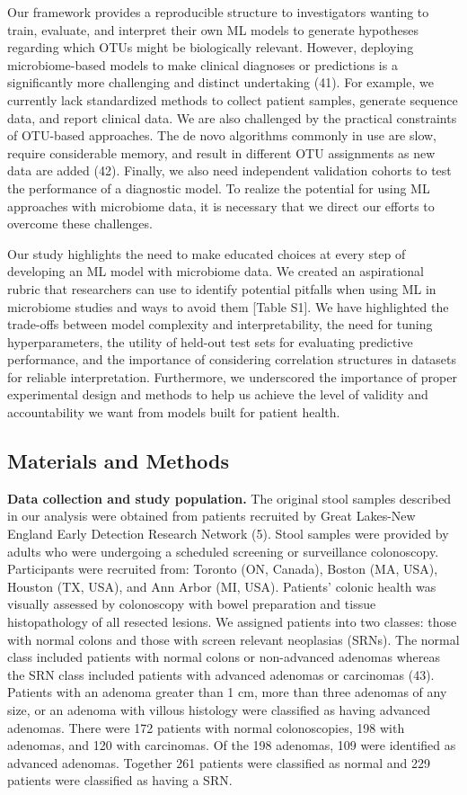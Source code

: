 \documentclass[11pt,]{article}
\begin{document}
Our framework provides a reproducible structure to investigators wanting
to train, evaluate, and interpret their own ML models to generate
hypotheses regarding which OTUs might be biologically relevant. However,
deploying microbiome-based models to make clinical diagnoses or
predictions is a significantly more challenging and distinct undertaking
(41). For example, we currently lack standardized methods to collect
patient samples, generate sequence data, and report clinical data. We
are also challenged by the practical constraints of OTU-based
approaches. The de novo algorithms commonly in use are slow, require
considerable memory, and result in different OTU assignments as new data
are added (42). Finally, we also need independent validation cohorts to
test the performance of a diagnostic model. To realize the potential for
using ML approaches with microbiome data, it is necessary that we direct
our efforts to overcome these challenges.

Our study highlights the need to make educated choices at every step of
developing an ML model with microbiome data. We created an aspirational
rubric that researchers can use to identify potential pitfalls when
using ML in microbiome studies and ways to avoid them {[}Table S1{]}. We
have highlighted the trade-offs between model complexity and
interpretability, the need for tuning hyperparameters, the utility of
held-out test sets for evaluating predictive performance, and the
importance of considering correlation structures in datasets for
reliable interpretation. Furthermore, we underscored the importance of
proper experimental design and methods to help us achieve the level of
validity and accountability we want from models built for patient
health.

\subsection{Materials and Methods}\label{materials-and-methods}

\textbf{Data collection and study population.} The original stool
samples described in our analysis were obtained from patients recruited
by Great Lakes-New England Early Detection Research Network (5). Stool
samples were provided by adults who were undergoing a scheduled
screening or surveillance colonoscopy. Participants were recruited from:
Toronto (ON, Canada), Boston (MA, USA), Houston (TX, USA), and Ann Arbor
(MI, USA). Patients' colonic health was visually assessed by colonoscopy
with bowel preparation and tissue histopathology of all resected
lesions. We assigned patients into two classes: those with normal colons
and those with screen relevant neoplasias (SRNs). The normal class
included patients with normal colons or non-advanced adenomas whereas
the SRN class included patients with advanced adenomas or carcinomas
(43). Patients with an adenoma greater than 1 cm, more than three
adenomas of any size, or an adenoma with villous histology were
classified as having advanced adenomas. There were 172 patients with
normal colonoscopies, 198 with adenomas, and 120 with carcinomas. Of the
198 adenomas, 109 were identified as advanced adenomas. Together 261
patients were classified as normal and 229 patients were classified as
having a SRN.
\end{document}
